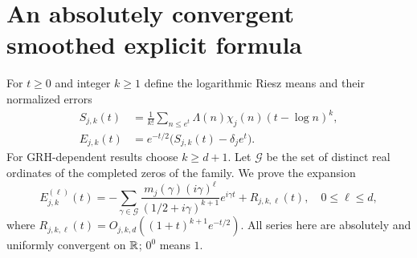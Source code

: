 \documentclass[11pt]{article}
\theoremstyle{remark}\newtheorem{remark}[theorem]{Remark}
\begin{document}
\section{An absolutely convergent smoothed explicit formula}
For $t\ge0$ and integer $k\ge1$ define the logarithmic Riesz means and their normalized errors
\begin{align}
 S_{j,k}(t)&=\frac1{k!}\sum_{n\le e^t}\Lambda(n)\chi_j(n)(t-\log n)^k,\\
 E_{j,k}(t)&=e^{-t/2}\big(S_{j,k}(t)-\delta_j e^t\big).
\end{align}
For GRH-dependent results choose $k\ge d+1$. Let $\mathcal G$ be the set of distinct real ordinates of the completed zeros of the family. We prove the expansion
\begin{equation}\label{fourier}
 E_{j,k}^{(\ell)}(t)=-\sum_{\gamma\in\mathcal G}
 \frac{m_j(\gamma)(i\gamma)^\ell}{(1/2+i\gamma)^{k+1}}e^{i\gamma t}
 + R_{j,k,\ell}(t),\quad 0\le\ell\le d,
\end{equation}
where $R_{j,k,\ell}(t)=O_{j,k,d}((1+t)^{k+1}e^{-t/2})$. All series here are absolutely and uniformly convergent on $\mathbb R$; $0^0$ means $1$.
\end{document}
